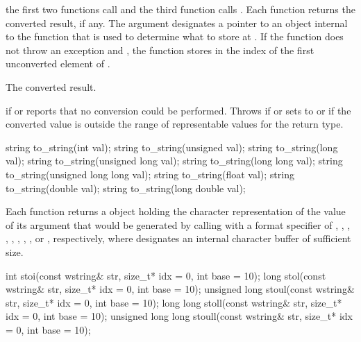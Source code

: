 \begin{itemdescr}
\pnum
\effects the first two functions call  and the
third function calls . Each function returns
the converted result, if any. The argument  designates a pointer to
an object internal to the function that is used to determine what to store at
. If the function does not throw an exception and ,
the function stores in  the index of the first unconverted element
of .

\pnum
\returns The converted result.

\pnum
\throws {} if  or  reports
that no conversion could be performed. Throws  if
 or  sets  to 
or if the converted value is outside the range of representable
values for the return type.
\end{itemdescr}

%
\begin{itemdecl}
string to_string(int val);
string to_string(unsigned val);
string to_string(long val);
string to_string(unsigned long val);
string to_string(long long val);
string to_string(unsigned long long val);
string to_string(float val);
string to_string(double val);
string to_string(long double val);
\end{itemdecl}

\begin{itemdescr}
\pnum
\returns Each function returns a  object holding the character
representation of the value of its argument that would be generated by calling
 with a format specifier of
,
,
,
,
,  ,
,
,
or , respectively, where  designates an internal
character buffer of sufficient size.
\end{itemdescr}

%
%
%
%
%
\begin{itemdecl}
int stoi(const wstring& str, size_t* idx = 0, int base = 10);
long stol(const wstring& str, size_t* idx = 0, int base = 10);
unsigned long stoul(const wstring& str, size_t* idx = 0, int base = 10);
long long stoll(const wstring& str, size_t* idx = 0, int base = 10);
unsigned long long stoull(const wstring& str, size_t* idx = 0, int base = 10);
\end{itemdecl}

